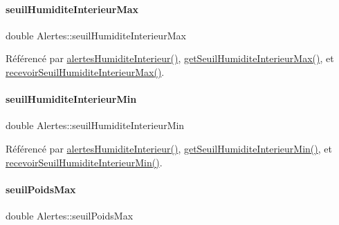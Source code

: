 \paragraph{\texorpdfstring{seuil\+Humidite\+Interieur\+Max}{seuilHumiditeInterieurMax}}
{\footnotesize\ttfamily double Alertes\+::seuil\+Humidite\+Interieur\+Max\hspace{0.3cm}{\ttfamily [private]}}



Référencé par \hyperlink{class_alertes_a7558cb097dc392547ceb12ab4d6cbd4c}{alertes\+Humidite\+Interieur()}, \hyperlink{class_alertes_a86e0bb83ac1fa5e704e3b7b3fc7147cd}{get\+Seuil\+Humidite\+Interieur\+Max()}, et \hyperlink{class_alertes_a7554e8b6752b0e0a5cfefeecfbc3ba56}{recevoir\+Seuil\+Humidite\+Interieur\+Max()}.

\mbox{\label{class_alertes_a501773587c8f2ccd032fe7db9af1f4e2}} 
\paragraph{\texorpdfstring{seuil\+Humidite\+Interieur\+Min}{seuilHumiditeInterieurMin}}
{\footnotesize\ttfamily double Alertes\+::seuil\+Humidite\+Interieur\+Min\hspace{0.3cm}{\ttfamily [private]}}



Référencé par \hyperlink{class_alertes_a7558cb097dc392547ceb12ab4d6cbd4c}{alertes\+Humidite\+Interieur()}, \hyperlink{class_alertes_a40d47b65952035b78cac05b915ad57b8}{get\+Seuil\+Humidite\+Interieur\+Min()}, et \hyperlink{class_alertes_a4444f527a708f8e1963d2dc1c95bad96}{recevoir\+Seuil\+Humidite\+Interieur\+Min()}.

\mbox{\label{class_alertes_a19b88c68325ccc6e5e8ad11a2537b25e}} 
\paragraph{\texorpdfstring{seuil\+Poids\+Max}{seuilPoidsMax}}
{\footnotesize\ttfamily double Alertes\+::seuil\+Poids\+Max\hspace{0.3cm}{\ttfamily [private]}}




